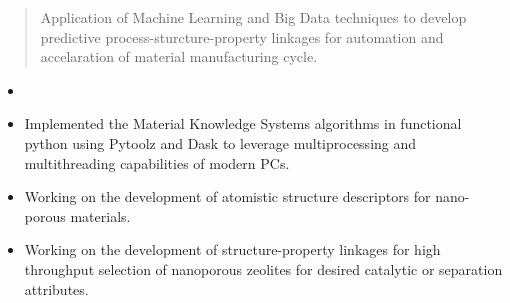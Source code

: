 \documentclass[10pt,a4paper]{altacv}
\begin{document}

\begin{fullwidth}
\makecvheader
\end{fullwidth}


\begin{quote}
Application of Machine Learning and Big Data
techniques to
develop predictive
process-sturcture-property linkages
for automation
and accelaration of material manufacturing
cycle.
\end{quote}


\begin{itemize}
\item {}
\item Implemented the Material Knowledge Systems algorithms in functional python using Pytoolz and Dask
to leverage multiprocessing and multithreading capabilities of modern PCs.
\end{itemize}

\divider

\begin{itemize}
\item Working on the development of atomistic structure descriptors for nano-porous
materials.
\item Working on the development of structure-property linkages for high throughput selection of
nanoporous zeolites for desired catalytic or separation attributes.
\end{itemize}
\end{document}
